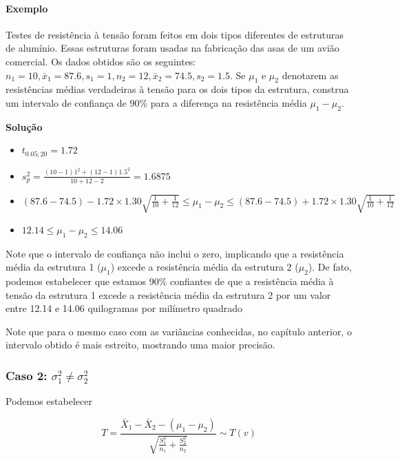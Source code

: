 \documentclass[
]{book}
\providecommand{\tightlist}{%
  \setlength{\itemsep}{0pt}\setlength{\parskip}{0pt}}
\begin{document}
\hypertarget{exemplo-12}{%
\paragraph{Exemplo}\label{exemplo-12}}

Testes de resistência à tensão foram feitos em dois tipos diferentes de estruturas de alumínio. Essas estruturas foram usadas na fabricação das asas de um avião comercial. Os dados obtidos são os seguintes: \(n_1=10, \bar x_1=87.6, s_1=1, n_2=12, \bar x_2=74.5, s_2=1.5\). Se \(\mu_1\) e \(\mu_2\) denotarem as resistências médias verdadeiras à tensão para os dois tipos da estrutura, construa um intervalo de confiança de 90\% para a diferença na resistência média \(\mu_1-\mu_2\).

\textbf{Solução}

\begin{itemize}
\tightlist
\item
  \(t_{0.05;20}=1.72\)
\item
  \(s^2_p=\frac{(10-1)1^2+(12-1)1.5^2}{10+12-2}=1.6875\)
\item
  \((87.6-74.5) -1.72\times 1.30\sqrt{\frac{1}{10}+\frac{1}{12}}\leq \mu_1-\mu_2 \leq (87.6-74.5) +1.72\times 1.30\sqrt{\frac{1}{10}+\frac{1}{12}}\)
\item
  \(12.14 \leq \mu_1-\mu_2 \leq 14.06\)
\end{itemize}

Note que o intervalo de confiança não inclui o zero, implicando que a resistência média da estrutura 1 (\(\mu_1\)) excede a resistência média da estrutura 2 (\(\mu_2\)). De fato, podemos estabelecer que estamos 90\% confiantes de que a resistência média à tensão da estrutura 1 excede a resistência média da estrutura 2 por um valor entre 12.14 e 14.06 quilogramas por milímetro quadrado

Note que para o mesmo caso com as variâncias conhecidas, no capítulo anterior, o intervalo obtido é mais estreito, mostrando uma maior precisão.

\hypertarget{caso-2-sigma2_1nesigma2_2}{%
\subsubsection{\texorpdfstring{Caso 2: \(\sigma^2_1\ne\sigma^2_2\)}{Caso 2: \textbackslash sigma\^{}2\_1\textbackslash ne\textbackslash sigma\^{}2\_2}}\label{caso-2-sigma2_1nesigma2_2}}

Podemos estabelecer

\[T=\frac{\bar X_1-\bar X_2-(\mu_1-\mu_2)}{\sqrt{\frac{S^2_1}{n_1}+\frac{S^2_2}{n_2}}}\sim T(v)\]
\end{document}
